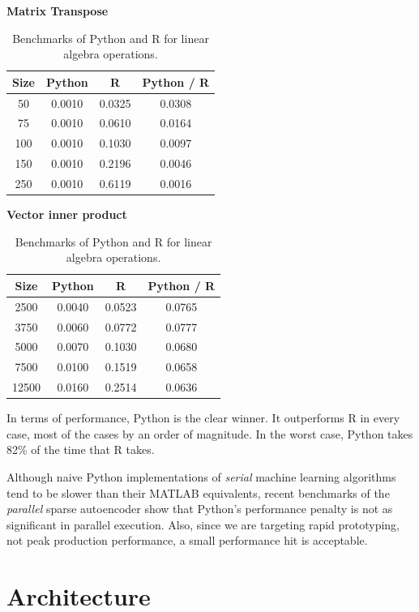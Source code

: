 \documentclass[%
  final,
  notitlepage,
  narroweqnarray,
  inline,
]{ieee}
\begin{document}
\begin{table}[h!]
\begin{center}
    \vspace{1em}
    \textbf{Matrix Transpose} \\
    \begin{tabular}{cccc}
      Size  & Python  &  R       & Python / R \\
      \hline
      50  & 0.0010  & 0.0325 & 0.0308 \\
      75  & 0.0010  & 0.0610 & 0.0164 \\
      100 & 0.0010  & 0.1030 & 0.0097 \\
      150 & 0.0010  & 0.2196 & 0.0046 \\
      250 & 0.0010  & 0.6119 & 0.0016 \\
    \end{tabular}

    \vspace{1em}
    \textbf{Vector inner product} \\
    \begin{tabular}{cccc}
      Size  & Python &  R       & Python / R \\
      \hline
      2500  & 0.0040 & 0.0523 & 0.0765 \\
      3750  & 0.0060 & 0.0772 & 0.0777 \\
      5000  & 0.0070 & 0.1030 & 0.0680 \\
      7500  & 0.0100 & 0.1519 & 0.0658 \\
      12500 & 0.0160 & 0.2514 & 0.0636 \\
    \end{tabular}
  \end{center}
  \caption{Benchmarks of Python and R for linear algebra
    operations.}
  \label{PythonvsR}
\end{table}


In terms of performance, Python is the clear winner. It outperforms R in every
case, most of the cases by an order of magnitude. In the worst case, Python
takes 82\% of the time that R takes.

Although naive Python implementations of {\it serial} machine learning algorithms
tend to be slower than their MATLAB equivalents, recent benchmarks of the {\it
  parallel} sparse autoencoder show that Python's performance penalty is not as
significant in parallel execution. Also, since we are targeting rapid
prototyping, not peak production performance, a small performance hit is
acceptable.

\section{Architecture}
\end{document}
